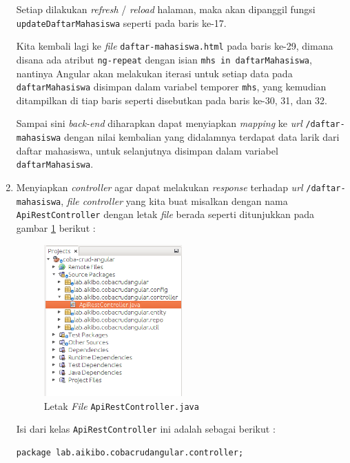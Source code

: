 \begin{enumerate}
	Setiap dilakukan \textit{refresh} / \textit{reload} halaman, maka akan dipanggil fungsi \texttt{updateDaftarMahasiswa} seperti pada baris ke-17.
	
	Kita kembali lagi ke \textit{file} \texttt{daftar-mahasiswa.html} pada baris ke-29, dimana disana ada atribut \texttt{ng-repeat} dengan isian \texttt{mhs in daftarMahasiswa}, nantinya Angular akan melakukan iterasi untuk setiap data pada \texttt{daftarMahasiswa} disimpan dalam variabel temporer \texttt{mhs}, yang kemudian ditampilkan di tiap baris seperti disebutkan pada baris ke-30, 31, dan 32.
	
	Sampai sini \textit{back-end} diharapkan dapat menyiapkan \textit{mapping} ke \textit{url} \texttt{/daftar-mahasiswa} dengan nilai kembalian yang didalamnya terdapat data larik dari daftar mahasiswa, untuk selanjutnya disimpan dalam variabel \texttt{daftarMahasiswa}.
	
	\item Menyiapkan \textit{controller} agar dapat melakukan \textit{response} terhadap \textit{url} \texttt{/daftar-mahasiswa}, \textit{file controller} yang kita buat misalkan dengan nama \texttt{ApiRestController} dengan letak \textit{file} berada seperti ditunjukkan pada gambar \ref{fig:letak-api-rest-controller} berikut :
	
	\begin{figure}[H]
		\centering
		\includegraphics[width=0.5\textwidth]{./resources/031-letak-api-rest-controller}
		\caption{Letak \textit{File} \texttt{ApiRestController.java}}
		\label{fig:letak-api-rest-controller}
	\end{figure}
	
	Isi dari kelas \texttt{ApiRestController} ini adalah sebagai berikut :
	
	\begin{lstlisting}
package lab.aikibo.cobacrudangular.controller;


\end{lstlisting}
\end{enumerate}
